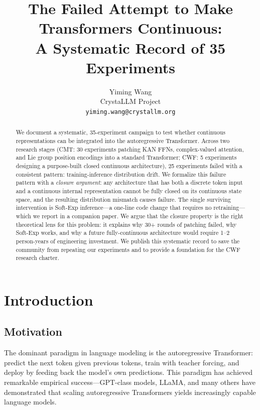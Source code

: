 \documentclass{article}
\title{The Failed Attempt to Make Transformers Continuous:\\
       A Systematic Record of 35 Experiments}
\author{%
  Yiming Wang \\
  CrystaLLM Project \\
  \texttt{yiming.wang@crystallm.org} \\
}
\begin{document}
\maketitle

\begin{abstract}
We document a systematic, 35-experiment campaign to test whether continuous representations can be integrated into the autoregressive Transformer. Across two research stages (CMT: 30 experiments patching KAN FFNs, complex-valued attention, and Lie group position encodings into a standard Transformer; CWF: 5 experiments designing a purpose-built closed continuous architecture), 25 experiments failed with a consistent pattern: training-inference distribution drift. We formalize this failure pattern with a \emph{closure argument}: any architecture that has both a discrete token input and a continuous internal representation cannot be fully closed on its continuous state space, and the resulting distribution mismatch causes failure. The single surviving intervention is Soft-Exp inference---a one-line code change that requires no retraining---which we report in a companion paper. We argue that the closure property is the right theoretical lens for this problem: it explains why 30+ rounds of patching failed, why Soft-Exp works, and why a future fully-continuous architecture would require 1--2 person-years of engineering investment. We publish this systematic record to save the community from repeating our experiments and to provide a foundation for the CWF research charter.
\end{abstract}

\section{Introduction}

\subsection{Motivation}

The dominant paradigm in language modeling is the autoregressive Transformer: predict the next token given previous tokens, train with teacher forcing, and deploy by feeding back the model's own predictions. This paradigm has achieved remarkable empirical success---GPT-class models, LLaMA, and many others have demonstrated that scaling autoregressive Transformers yields increasingly capable language models.
\end{document}
